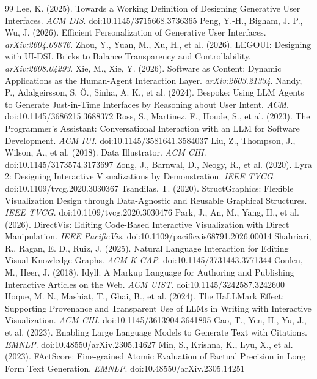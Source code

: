 \documentclass[11pt]{article}
\begin{document}
\begin{thebibliography}{99}
 Lee, K. (2025). Towards a Working Definition of Designing Generative User Interfaces. \emph{ACM DIS}. doi:10.1145/3715668.3736365
 Peng, Y.-H., Bigham, J. P., Wu, J. (2026). Efficient Personalization of Generative User Interfaces. \emph{arXiv:2604.09876}.
 Zhou, Y., Yuan, M., Xu, H., et al. (2026). LEGOUI: Designing with UI-DSL Bricks to Balance Transparency and Controllability. \emph{arXiv:2608.04293}.
 Xie, M., Xie, Y. (2026). Software as Content: Dynamic Applications as the Human-Agent Interaction Layer. \emph{arXiv:2603.21334}.
 Nandy, P., Adalgeirsson, S. \"O., Sinha, A. K., et al. (2024). Bespoke: Using LLM Agents to Generate Just-in-Time Interfaces by Reasoning about User Intent. \emph{ACM}. doi:10.1145/3686215.3688372
 Ross, S., Martinez, F., Houde, S., et al. (2023). The Programmer's Assistant: Conversational Interaction with an LLM for Software Development. \emph{ACM IUI}. doi:10.1145/3581641.3584037
 Liu, Z., Thompson, J., Wilson, A., et al. (2018). Data Illustrator. \emph{ACM CHI}. doi:10.1145/3173574.3173697
 Zong, J., Barnwal, D., Neogy, R., et al. (2020). Lyra 2: Designing Interactive Visualizations by Demonstration. \emph{IEEE TVCG}. doi:10.1109/tvcg.2020.3030367
 Tsandilas, T. (2020). StructGraphics: Flexible Visualization Design through Data-Agnostic and Reusable Graphical Structures. \emph{IEEE TVCG}. doi:10.1109/tvcg.2020.3030476
 Park, J., An, M., Yang, H., et al. (2026). DirectVis: Editing Code-Based Interactive Visualization with Direct Manipulation. \emph{IEEE PacificVis}. doi:10.1109/pacificvis68791.2026.00014
 Shahriari, R., Ragan, E. D., Ruiz, J. (2025). Natural Language Interaction for Editing Visual Knowledge Graphs. \emph{ACM K-CAP}. doi:10.1145/3731443.3771344
 Conlen, M., Heer, J. (2018). Idyll: A Markup Language for Authoring and Publishing Interactive Articles on the Web. \emph{ACM UIST}. doi:10.1145/3242587.3242600
 Hoque, M. N., Mashiat, T., Ghai, B., et al. (2024). The HaLLMark Effect: Supporting Provenance and Transparent Use of LLMs in Writing with Interactive Visualization. \emph{ACM CHI}. doi:10.1145/3613904.3641895
 Gao, T., Yen, H., Yu, J., et al. (2023). Enabling Large Language Models to Generate Text with Citations. \emph{EMNLP}. doi:10.48550/arXiv.2305.14627
 Min, S., Krishna, K., Lyu, X., et al. (2023). FActScore: Fine-grained Atomic Evaluation of Factual Precision in Long Form Text Generation. \emph{EMNLP}. doi:10.48550/arXiv.2305.14251

\end{thebibliography}
\end{document}
